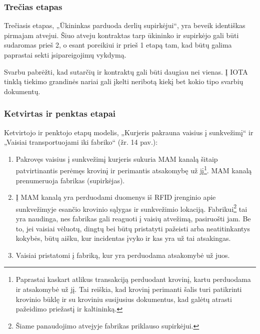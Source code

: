 
\subsubsection{Trečias etapas}

Trečiasis etapas, „Ūkininkas parduoda derlių supirkėjui“, yra beveik identiškas pirmajam atvejui. Šiuo atveju kontraktas tarp ūkininko ir supirkėjo gali būti sudaromas prieš 2, o esant poreikiui ir prieš 1 etapą tam, kad būtų galima paprastai sekti įsipareigojimų vykdymą.

Svarbu pabrėžti, kad sutarčių ir kontraktų gali būti daugiau nei vienas. Į IOTA tinklą tiekimo grandinės nariai gali įkelti neribotą kiekį bet kokio tipo svarbių dokumentų.




\subsubsection{Ketvirtas ir penktas etapai}

Ketvirtojo ir penktojo etapų modelis, „Kurjeris pakrauna vaisius į sunkvežimį“ ir „Vaisiai transportuojami iki fabriko“ (žr. 14 pav.):
\begin{enumerate}
    \item Pakrovęs vaisius į sunkvežimį kurjeris sukuria MAM kanalą šitaip patvirtinantis perėmęs krovinį ir perimantis atsakomybę už jį\footnote{Paprastai kaskart atlikus transakciją perduodant krovinį, kartu perduodama ir atsakomybė už jį. Tai reiškia, kad krovinį perimanti šalis turi patikrinti krovinio būklę ir su kroviniu susijusius dokumentus, kad galėtų atrasti pažeidimo priežastį ir kaltininką.}. MAM kanalą prenumeruoja fabrikas (supirkėjas).
    \item Į MAM kanalą yra perduodami duomenys iš RFID įrenginio apie sunkvežimyje esančio krovinio sąlygas ir sunkvežimio lokaciją. Fabrikui\footnote{Šiame panaudojimo atvejyje fabrikas priklauso supirkėjui.} tai yra naudinga, nes fabrikas gali reaguoti į vaisių atvežimą, pasiruošti jam. Be to, jei vaisiai vėluotų, dingtų bei būtų pristatyti pažeisti arba neatitinkantys kokybės, būtų aišku, kur incidentas įvyko ir kas yra už tai atsakingas.
    \item Vaisiai pristatomi į fabriką, kur yra perduodama atsakomybė už juos.
\end{enumerate}

